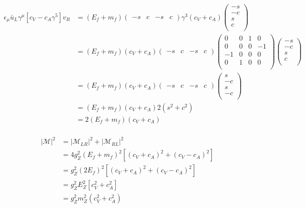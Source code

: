 \begin{align*}
    \epsilon_\mu \bar{u}_L \gamma^\mu [c_V - c_A \gamma^5]v_R &= (E_f+m_f)\begin{pmatrix}
        -s & c & -s & c
    \end{pmatrix} \gamma^3 (c_V + c_A)\begin{pmatrix}
        -s \\ -c \\ s \\ c \\
    \end{pmatrix} \\
    &= (E_f+m_f)(c_V + c_A)\begin{pmatrix}
        -s & c & -s & c
    \end{pmatrix} \begin{pmatrix}
        0 & 0 & 1 & 0 \\
        0 & 0 & 0 & -1 \\
        -1 & 0 & 0 & 0 \\
        0 & 1 & 0 & 0 \\
    \end{pmatrix} \begin{pmatrix}
        -s \\ -c \\ s \\ c \\
    \end{pmatrix} \\
    &= (E_f+m_f)(c_V + c_A)\begin{pmatrix}
        -s & c & -s & c
    \end{pmatrix} \begin{pmatrix}
        s \\
        -c \\
        s \\
        -c \\
    \end{pmatrix} \\
    &= (E_f+m_f)(c_V + c_A)2(s^2+c^2) \\
    &= 2(E_f+m_f)(c_V + c_A) \\
\end{align*}

\begin{align*}
    |\mathcal{M}|^2 &= |\mathcal{M}_{LR}|^2 + |\mathcal{M}_{RL}|^2 \\
    &= 4g_Z^2(E_f+m_f)^2[(c_V + c_A)^2 + (c_V - c_A)^2] \\
    &= g_Z^2(2E_f)^2[(c_V + c_A)^2 + (c_V - c_A)^2] \\
    &= g_Z^2 E_Z^2[c_V^2 + c_A^2] \\
    &= g_Z^2 m_Z^2(c_V^2 + c_A^2) \\
\end{align*}

